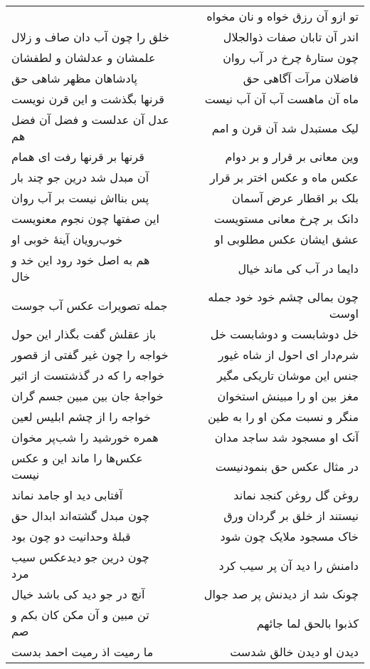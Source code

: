 \begin{center}
\begin{longtable}{l p{0.5cm} r}
&&
تو ازو آن رزق خواه و نان مخواه
\\
خلق را چون آب دان صاف و زلال
&&
اندر آن تابان صفات ذوالجلال
\\
علمشان و عدلشان و لطفشان
&&
چون ستارهٔ چرخ در آب روان
\\
پادشاهان مظهر شاهی حق
&&
فاضلان مرآت آگاهی حق
\\
قرنها بگذشت و این قرن نویست
&&
ماه آن ماهست آب آن آب نیست
\\
عدل آن عدلست و فضل آن فضل هم
&&
لیک مستبدل شد آن قرن و امم
\\
قرنها بر قرنها رفت ای همام
&&
وین معانی بر قرار و بر دوام
\\
آن مبدل شد درین جو چند بار
&&
عکس ماه و عکس اختر بر قرار
\\
پس بنااش نیست بر آب روان
&&
بلک بر اقطار عرض آسمان
\\
این صفتها چون نجوم معنویست
&&
دانک بر چرخ معانی مستویست
\\
خوب‌رویان آینهٔ خوبی او
&&
عشق ایشان عکس مطلوبی او
\\
هم به اصل خود رود این خد و خال
&&
دایما در آب کی ماند خیال
\\
جمله تصویرات عکس آب جوست
&&
چون بمالی چشم خود خود جمله اوست
\\
باز عقلش گفت بگذار این حول
&&
خل دوشابست و دوشابست خل
\\
خواجه را چون غیر گفتی از قصور
&&
شرم‌دار ای احول از شاه غیور
\\
خواجه را که در گذشتست از اثیر
&&
جنس این موشان تاریکی مگیر
\\
خواجهٔ جان بین مبین جسم گران
&&
مغز بین او را مبینش استخوان
\\
خواجه را از چشم ابلیس لعین
&&
منگر و نسبت مکن او را به طین
\\
همره خورشید را شب‌پر مخوان
&&
آنک او مسجود شد ساجد مدان
\\
عکس‌ها را ماند این و عکس نیست
&&
در مثال عکس حق بنمودنیست
\\
آفتابی دید او جامد نماند
&&
روغن گل روغن کنجد نماند
\\
چون مبدل گشته‌اند ابدال حق
&&
نیستند از خلق بر گردان ورق
\\
قبلهٔ وحدانیت دو چون بود
&&
خاک مسجود ملایک چون شود
\\
چون درین جو دیدعکس سیب مرد
&&
دامنش را دید آن پر سیب کرد
\\
آنچ در جو دید کی باشد خیال
&&
چونک شد از دیدنش پر صد جوال
\\
تن مبین و آن مکن کان بکم و صم
&&
کذبوا بالحق لما جائهم
\\
ما رمیت اذ رمیت احمد بدست
&&
دیدن او دیدن خالق شدست

\end{longtable}
\end{center}
